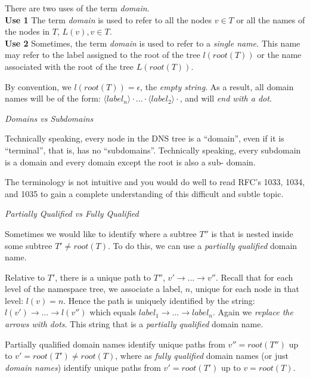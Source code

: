 There are two uses of the term \textit{domain}. \\
\textbf{Use 1} The term \textit{domain} is used 
to refer to all the nodes $v \in T$ or all the names of 
the nodes in $T$, $L(v), v \in T$. \\
\textbf{Use 2} Sometimes, the term \textit{domain} is used 
to refer to a \textit{single name}. This name may refer to the 
label assigned to the root of the tree $l(root(T))$ or the 
name associated with the root of the tree $L(root(T))$.

By convention, we $l(root(T)) = \epsilon$, the \textit{empty string}.
As a result, all domain names will be of the form: 
$\langle label_n \rangle \cdot ... \cdot \langle label_2 \rangle \cdot$, 
and will \textit{end with a dot}.  

\frmrule

\textit{Domains vs Subdomains}

Technically   speaking,  every  node  in  the  DNS  tree  is  a
``domain'', even if it is ``terminal'', that is,  has  no
``subdomains''.  Technically speaking, every subdomain is
a domain and every domain except the root is also a sub-
domain.   
   
The  terminology is not intuitive and you would do well to read 
RFC's 1033, 1034, and 1035 to gain a complete understanding of 
this difficult and subtle topic.


\frmrule 

\begin{example}
\end{example}

\frmrule 


\textit{Partially Qualified vs Fully Qualified}

Sometimes we would like to identify where a subtree $T''$ is 
that is nested inside some subtree $T' \neq root(T)$. 
To do this, we can use a \textit{partially qualified} domain name. 

Relative to $T'$, there is a unique path to $T''$, 
$v' \rightarrow ... \rightarrow v''$. Recall that
for each level of the namespace tree, 
we associate a label, $n$, unique for each node in that level: $l(v) = n$. 
Hence the path is uniquely 
identified by the string: $l(v') \rightarrow ... \rightarrow l(v'')$ 
which equals $label_1 \rightarrow ... \rightarrow label_n$. 
Again we \textit{replace the arrows with dots}. 
This string that is a \textit{partially qualified} domain name. 

Partially qualified domain names identify unique paths from $v'' = root(T'')$ up to $v' = root(T') \neq root(T)$, 
where as \textit{fully qualified} domain names (or just \textit{domain names}) 
identify unique paths from $v' = root(T')$ up to $v = root(T)$. 

